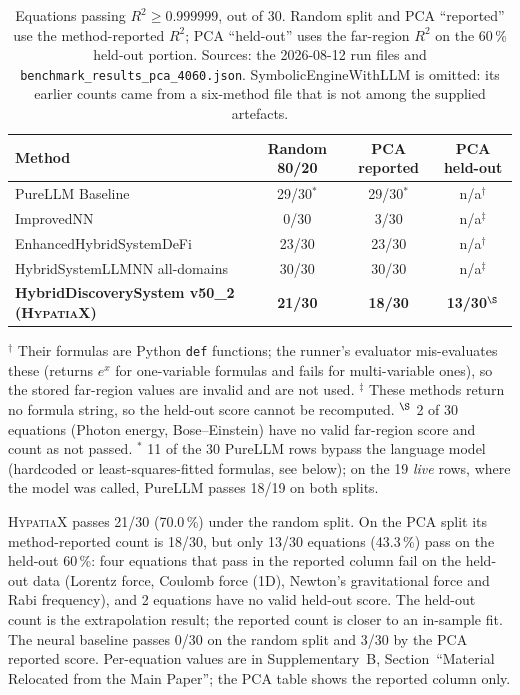 \documentclass[twoside,11pt]{article}
\newcommand{\Rsq}{R^{2}}
\begin{document}
\begin{table}[h]
\centering
\caption{Equations passing $\Rsq \geq 0.999999$, out of 30. Random split and PCA ``reported'' use the
  method-reported $\Rsq$; PCA ``held-out'' uses the far-region $\Rsq$ on the 60\,\% held-out portion.
  Sources: the 2026-08-12 run files and \texttt{benchmark\_results\_pca\_4060.json}. SymbolicEngineWithLLM is omitted: its earlier counts came from a six-method file that is not among the supplied artefacts.}
\label{tab:feynman30-methods}
\small
\begin{tabular}{lccc}
\toprule
Method & Random 80/20 & PCA reported & PCA held-out \\
\midrule
PureLLM Baseline & 29/30$^\ast$ & 29/30$^\ast$ & n/a$^\dagger$ \\
ImprovedNN & 0/30 & 3/30 & n/a$^\ddagger$ \\
EnhancedHybridSystemDeFi & 23/30 & 23/30 & n/a$^\dagger$ \\
HybridSystemLLMNN all-domains & 30/30 & 30/30 & n/a$^\ddagger$ \\
\textbf{HybridDiscoverySystem v50\_2 (\textsc{HypatiaX})} & \textbf{21/30} & \textbf{18/30} & \textbf{13/30}$^\S$ \\
\bottomrule
\end{tabular}

{\footnotesize $^\dagger$ Their formulas are Python \texttt{def} functions; the runner's evaluator
mis-evaluates these (returns $e^{x}$ for one-variable formulas and fails for multi-variable ones), so the
stored far-region values are invalid and are not used. $^\ddagger$ These methods return no formula string, so the held-out score cannot be recomputed.
$^\S$ 2 of 30 equations (Photon energy, Bose--Einstein) have no valid far-region score and count as not passed.
$^\ast$ 11 of the 30 PureLLM rows bypass the language model (hardcoded or least-squares-fitted formulas, see below); on the 19 \emph{live} rows, where the model was called, PureLLM passes 18/19 on both splits.}
\end{table}

\textsc{HypatiaX} passes 21/30 (70.0\,\%) under the random split. On the PCA split its method-reported
count is 18/30, but only 13/30 equations (43.3\,\%) pass on the held-out 60\,\%: four equations that pass in
the reported column fail on the held-out data (Lorentz force, Coulomb force (1D), Newton's gravitational force and
Rabi frequency), and 2 equations have no valid held-out score. The
held-out count is the extrapolation result; the reported count is closer to an in-sample fit. The neural baseline
passes 0/30 on the random split and 3/30 by the PCA reported score. Per-equation values are in
Supplementary~B, Section~``Material Relocated from the Main Paper''; the PCA table shows the reported column only.
\end{document}
